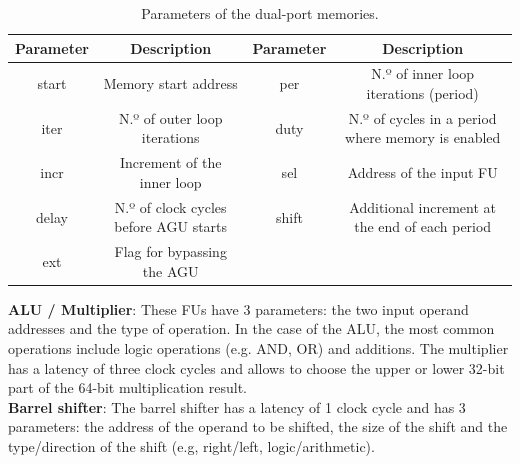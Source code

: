 \begin{table}[!htb]
    \footnotesize
    \centering
    \caption{Parameters of the dual-port memories.}
    \label{tab:versat_agu_param}
    \begin{tabular}{|c|c|c|c|}
    \hline
    Parameter   &  Description                          & Parameter     &  Description                                      \\ \hline
    start       & Memory start address                  & per           & N.º of inner loop iterations (period)             \\ \hline
    iter        & N.º of outer loop iterations          & duty          & N.º of cycles in a period where memory is enabled \\ \hline
    incr        & Increment of the inner loop           & sel           & Address of the input FU                           \\ \hline
    delay       & N.º of clock cycles before AGU starts & shift         & Additional increment at the end of each period    \\ \hline
    ext         & Flag for bypassing the AGU            & \multicolumn{2}{c|}{}                                                   \\ \hline
    \end{tabular}
\end{table}



\textbf{ALU / Multiplier}: These FUs have 3 parameters: the two input operand addresses and the type of operation. In the case of the ALU,
the most common operations include logic operations (e.g. AND, OR) and
additions. The multiplier has a latency of three clock cycles and allows to
choose the upper or lower 32-bit part of the 64-bit multiplication result.\\

\vspace{-0.4cm} \textbf{Barrel shifter}: The barrel shifter has a latency of 1 clock cycle and has 3 parameters: the address of the operand to be shifted, the size of the shift and the type/direction of the shift (e.g, right/left, logic/arithmetic).\\

